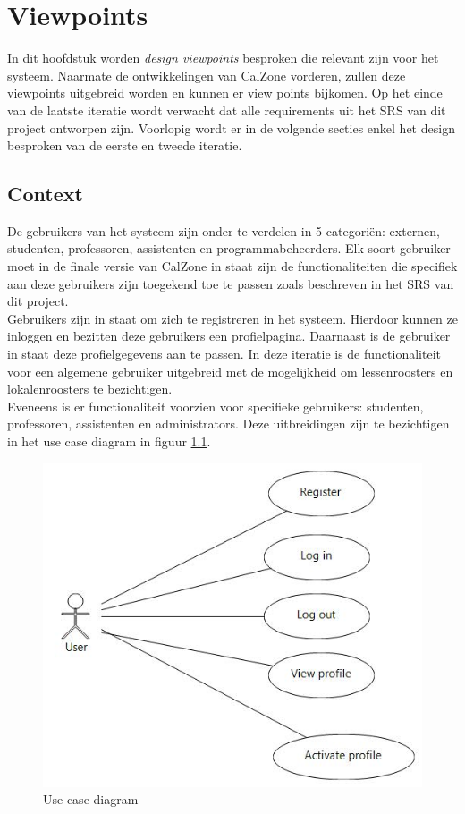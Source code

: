 \chapter{Viewpoints}
\label{chap:viewpoints}

In dit hoofdstuk worden \emph{design viewpoints} besproken die relevant zijn voor het systeem. 
Naarmate de ontwikkelingen van CalZone vorderen, zullen deze viewpoints uitgebreid worden en kunnen er view points bijkomen. 
Op het einde van de laatste iteratie wordt verwacht dat alle requirements uit het SRS van dit project ontworpen zijn. 
Voorlopig wordt er in de volgende secties enkel het design besproken van de eerste en tweede iteratie.

\section{Context}
\label{sec:context}

De gebruikers van het systeem zijn onder te verdelen in 5 categori\"{e}n: externen, studenten, professoren, assistenten en programmabeheerders. 
Elk soort gebruiker moet in de finale versie van CalZone in staat zijn de functionaliteiten die specifiek aan deze gebruikers zijn toegekend toe te passen zoals beschreven in het SRS van dit project. 
\\
Gebruikers zijn in staat om zich te registreren in het systeem. 
Hierdoor kunnen ze inloggen en bezitten deze gebruikers een profielpagina.
Daarnaast is de gebruiker in staat deze profielgegevens aan te passen.
In deze iteratie is de functionaliteit voor een algemene gebruiker uitgebreid met de mogelijkheid om lessenroosters en lokalenroosters te bezichtigen.
\\
Eveneens is er functionaliteit voorzien voor specifieke gebruikers: studenten, professoren, assistenten en administrators.
Deze uitbreidingen zijn te bezichtigen in het use case diagram in figuur \ref{fig:usecase}.

\begin{figure}[H]
	\centering
	\includegraphics[scale=0.5]{img/use_cases}
	\caption{Use case diagram}
	\label{fig:usecase}
\end{figure}

